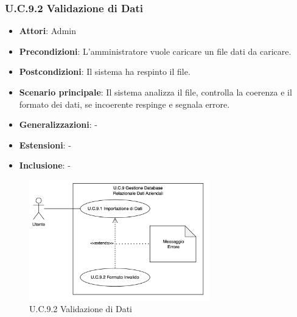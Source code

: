 \subsubsection{U.C.9.2 Validazione di Dati}
\begin{itemize}
    \item \textbf{Attori}: Admin
    \item \textbf{Precondizioni}: L’amministratore vuole caricare un file dati da caricare.
    \item \textbf{Postcondizioni}: Il sistema ha respinto il file.
    \item \textbf{Scenario principale}: Il sistema analizza il file, controlla la coerenza e il formato dei dati, se incoerente respinge e segnala errore.
    \item \textbf{Generalizzazioni}: -
    \item \textbf{Estensioni}: -
    \item \textbf{Inclusione}: -
\end{itemize}
\begin{figure}[H]
    \centering
    \includegraphics[width=0.7\textwidth]{img/U.C.9.2.png}
    \caption{U.C.9.2 Validazione di Dati}
\end{figure}
\newpage

